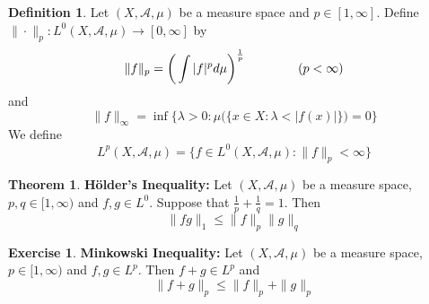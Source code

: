 \documentclass[12pt]{amsart}
\theoremstyle{definition}
\newtheorem{defn}[definition]{Definition}
\newtheorem{thm}[definition]{Theorem}
\newtheorem{ex}[definition]{Exercise}
\newcommand{\lam}{\lambda}
\newcommand{\MA}{\mathcal{A}}
\begin{document}
	\begin{defn}
		Let $(X, \MA, \mu)$ be a measure space and $p \in [1, \infty]$. Define $  \| \cdot \|_p : L^0(X, \MA, \mu) \rightarrow [0, \infty]$ by $$\|f \|_p = \bigg(\int \vert f \vert^p d\mu \bigg)^{\frac{1}{p}} \hspace{1.5cm}( p < \infty)$$ 
		and 
		$$\|f \|_{\infty} = \inf \bigg \{\lam >0: \mu\big(\{x \in X: \lam < \vert f(x) \vert  \}\big) = 0 \bigg \} $$
		We define $$L^p(X, \MA, \mu) =  \{f \in L^0(X, \MA, \mu): \|f \|_p < \infty \}$$
	\end{defn}
	
	\begin{thm}{\textbf{Hölder's Inequality:}}
		Let $(X, \MA, \mu)$ be a measure space, $p,q \in [1, \infty)$ and $f,g \in L^0$. Suppose that $\frac{1}{p} + \frac{1}{q} = 1$. Then $$\|fg\|_1 \leq \|f \|_p \|g \|_q$$
	\end{thm}
	
	\begin{ex}\textbf{Minkowski Inequality:}
		Let $(X, \MA, \mu)$ be a measure space, $p \in [1, \infty)$ and $f,g \in L^p$. Then $f+g \in L^p$ and $$\|f+g\|_p  \leq \|f\|_p + \|g\|_p $$
	\end{ex}
	
\end{document}
